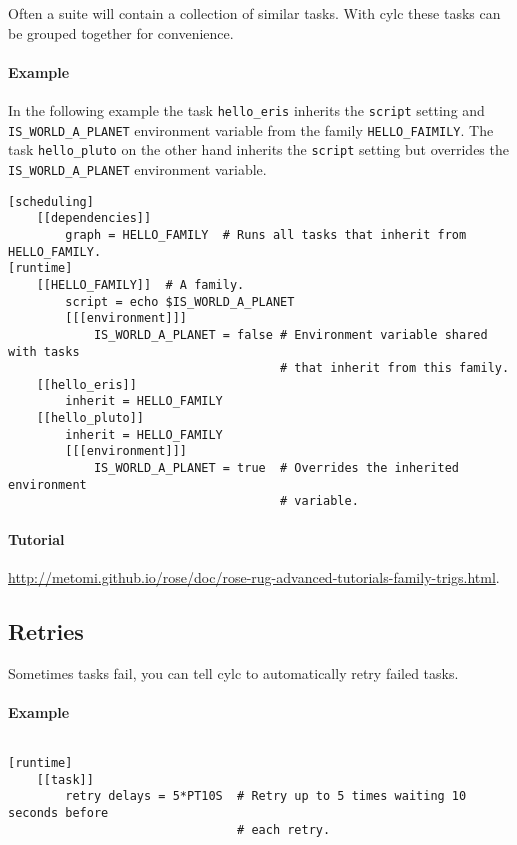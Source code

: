 Often a suite will contain a collection of similar tasks. With cylc these
tasks can be grouped together for convenience.

\paragraph*{Example}
In the following example the
task \lstinline{hello_eris} inherits the \lstinline{script} setting and
\lstinline{IS_WORLD_A_PLANET} environment variable from the family
\lstinline{HELLO_FAIMILY}. The task \lstinline{hello_pluto} on the other hand
inherits the \lstinline{script} setting but overrides the
\lstinline{IS_WORLD_A_PLANET} environment variable.

\begin{lstlisting}
[scheduling]
    [[dependencies]]
        graph = HELLO_FAMILY  # Runs all tasks that inherit from HELLO_FAMILY.
[runtime]
    [[HELLO_FAMILY]]  # A family.
        script = echo $IS_WORLD_A_PLANET
        [[[environment]]]
            IS_WORLD_A_PLANET = false # Environment variable shared with tasks
                                      # that inherit from this family.
    [[hello_eris]]
        inherit = HELLO_FAMILY
    [[hello_pluto]]
        inherit = HELLO_FAMILY
        [[[environment]]]
            IS_WORLD_A_PLANET = true  # Overrides the inherited environment
                                      # variable.
\end{lstlisting}

\paragraph*{Tutorial}
\url{http://metomi.github.io/rose/doc/rose-rug-advanced-tutorials-family-trigs.html}.


\subsection{Retries}
Sometimes tasks fail, you can tell cylc to automatically retry failed tasks.

\paragraph*{Example} $ $

\begin{lstlisting}
[runtime]
    [[task]]
        retry delays = 5*PT10S  # Retry up to 5 times waiting 10 seconds before
                                # each retry.
\end{lstlisting}

